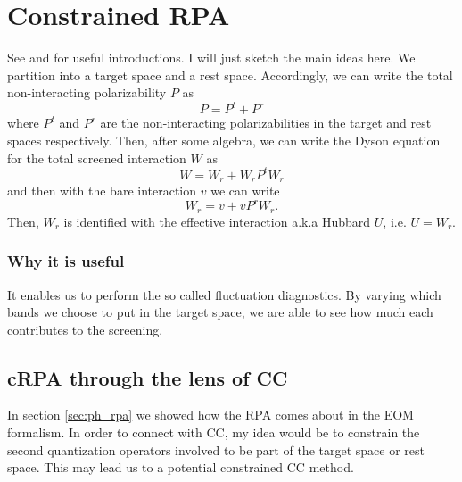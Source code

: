 \section{Constrained RPA}
See \cite{aryasetiawan_downfolding_nodate} and \cite{van2021random} for useful introductions. I will just sketch the main ideas here. We partition into a target space and a rest space. Accordingly, we can write the total non-interacting polarizability $P$ as
\begin{equation}
    P = P^t + P^r
\end{equation}
where $P^t$ and $P^r$ are the non-interacting polarizabilities in the target and rest spaces respectively. Then, after some algebra, we can write the Dyson equation for the total screened interaction $W$ as
\begin{equation}
    W = W_r + W_r P^t W_r
\end{equation}
and then with the bare interaction $v$ we can write
\begin{equation}
    W_r = v + v P^r W_r.
\end{equation}
Then, $W_r$ is identified with the effective interaction a.k.a Hubbard $U$, i.e. $U = W_r$. 
\subsubsection{Why it is useful}
It enables us to perform the so called fluctuation diagnostics. By varying which bands we choose to put in the target space, we are able to see how much each contributes to the screening. 
\subsection{cRPA through the lens of CC}
In section \ref{sec:ph_rpa} we showed how the RPA comes about in the EOM formalism. In order to connect with CC, my idea would be to constrain the second quantization operators involved to be part of the target space or rest space. This may lead us to a potential constrained CC method.


